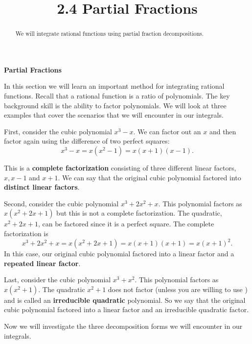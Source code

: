 \documentclass{ximera}
\title{2.4 Partial Fractions}
\begin{document}
\begin{abstract}
We will integrate rational functions using partial fraction decompositions.
\end{abstract}

\maketitle

\begin{center}
\textbf{Partial Fractions}
\end{center}

In this section we will learn an important method for integrating rational functions.
Recall that a rational function is a ratio of polynomials. The key background skill is the ability to factor polynomials.
We will look at three examples that cover the scenarios that we will encounter in our integrals. 

First, consider the cubic polynomial  $x^3 - x$.  
We can factor out an $x$ and then factor again using the difference of two perfect squares:
\[
x^3 - x = x(x^2-1) = x(x+1)(x-1).
\]

This is a \textbf{complete factorization} consisting of three different linear factors, $x, x-1$ and $x+1$.
We can say that the original cubic polynomial factored into \textbf{distinct linear factors}.

Second, consider the cubic polynomial $x^3 + 2x^2 + x$.  This polynomial factors as $x(x^2 + 2x + 1)$ but this is not a complete factorization. 
The quadratic, $x^2 + 2x + 1$, can be factored since it is a perfect square.  The complete factorization is 
\[
x^3 + 2x^2 + x= x(x^2 + 2x + 1) = x(x+1)(x+1) = x(x+1)^2.
\]
In this case, our original cubic polynomial factored into a linear factor and a \textbf{repeated linear factor}.

Last, consider the cubic polynomial $x^3 + x^2$.  This polynomial factors as $x(x^2 + 1)$.
The quadratic $x^2 + 1$ does not factor (unless you are willing to 
use ) and is called 
an \textbf{irreducible quadratic} polynomial.
So we say that the original cubic polynomial factored into a linear factor and an irreducible quadratic factor.

Now we will investigate the three decomposition forms we will encounter in our integrals.
\end{document}

